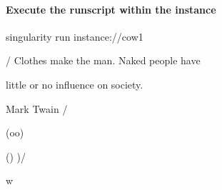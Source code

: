 \documentclass[letterpaper,10pt,english]{sphinxmanual}
\begin{document}
\paragraph{Execute the runscript within the instance}
\label{\detokenize{appendix:execute-the-runscript-within-the-instance}}
%
\begin{sphinxVerbatim}[commandchars=\\\{\}]
\PYGZdl{} singularity run instance://cow1

 \PYGZus{}\PYGZus{}\PYGZus{}\PYGZus{}\PYGZus{}\PYGZus{}\PYGZus{}\PYGZus{}\PYGZus{}\PYGZus{}\PYGZus{}\PYGZus{}\PYGZus{}\PYGZus{}\PYGZus{}\PYGZus{}\PYGZus{}\PYGZus{}\PYGZus{}\PYGZus{}\PYGZus{}\PYGZus{}\PYGZus{}\PYGZus{}\PYGZus{}\PYGZus{}\PYGZus{}\PYGZus{}\PYGZus{}\PYGZus{}\PYGZus{}\PYGZus{}\PYGZus{}\PYGZus{}\PYGZus{}\PYGZus{}\PYGZus{}\PYGZus{}\PYGZus{}\PYGZus{}\PYGZus{}

/ Clothes make the man. Naked people have \PYGZbs{}

\textbar{} little or no influence on society.      \textbar{}

\textbar{}                                         \textbar{}

\PYGZbs{} \PYGZhy{}\PYGZhy{} Mark Twain                           /

 \PYGZhy{}\PYGZhy{}\PYGZhy{}\PYGZhy{}\PYGZhy{}\PYGZhy{}\PYGZhy{}\PYGZhy{}\PYGZhy{}\PYGZhy{}\PYGZhy{}\PYGZhy{}\PYGZhy{}\PYGZhy{}\PYGZhy{}\PYGZhy{}\PYGZhy{}\PYGZhy{}\PYGZhy{}\PYGZhy{}\PYGZhy{}\PYGZhy{}\PYGZhy{}\PYGZhy{}\PYGZhy{}\PYGZhy{}\PYGZhy{}\PYGZhy{}\PYGZhy{}\PYGZhy{}\PYGZhy{}\PYGZhy{}\PYGZhy{}\PYGZhy{}\PYGZhy{}\PYGZhy{}\PYGZhy{}\PYGZhy{}\PYGZhy{}\PYGZhy{}\PYGZhy{}

        \PYGZbs{}   \PYGZca{}\PYGZus{}\PYGZus{}\PYGZca{}

         \PYGZbs{}  (oo)\PYGZbs{}\PYGZus{}\PYGZus{}\PYGZus{}\PYGZus{}\PYGZus{}\PYGZus{}\PYGZus{}

            (\PYGZus{}\PYGZus{})\PYGZbs{}       )\PYGZbs{}/\PYGZbs{}

                \textbar{}\textbar{}\PYGZhy{}\PYGZhy{}\PYGZhy{}\PYGZhy{}w \textbar{}

                \textbar{}\textbar{}     \textbar{}\textbar{}
\end{sphinxVerbatim}
\end{document}
